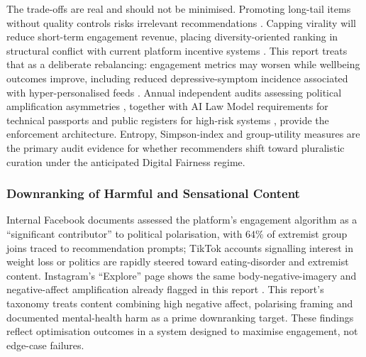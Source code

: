 \documentclass[11pt]{article}
\begin{document}
The trade-offs are real and should not be minimised. Promoting long-tail items without quality controls risks irrelevant recommendations \parencites[28]{6577872}. Capping virality will reduce short-term engagement revenue, placing diversity-oriented ranking in structural conflict with current platform incentive systems \parencites[14]{6502223}. This report treats that as a deliberate rebalancing: engagement metrics may worsen while wellbeing outcomes improve, including reduced depressive-symptom incidence associated with hyper-personalised feeds \parencites[20]{3303310}. Annual independent audits assessing political amplification asymmetries \parencites[16]{6502223}, together with AI Law Model requirements for technical passports and public registers for high-risk systems \parencites[19.5]{2977039}, provide the enforcement architecture. Entropy, Simpson-index and group-utility measures are the primary audit evidence for whether recommenders shift toward pluralistic curation under the anticipated Digital Fairness regime.

\subsubsection{Downranking of Harmful and Sensational Content}
\label{sec:downranking_harmful_sensational} Internal Facebook documents assessed \parencites[2244]{6502223} the platform's engagement algorithm as a ``significant contributor'' to political polarisation, with $64\%$ of extremist group joins traced to recommendation prompts; TikTok accounts signalling interest in weight loss or politics are rapidly steered toward eating-disorder and extremist content. Instagram's ``Explore'' page shows the same body-negative-imagery and negative-affect amplification already flagged in this report \parencites[3]{3303310}[20]{3303310}. This report's taxonomy treats content combining high negative affect, polarising framing and documented mental-health harm as a prime downranking target. These findings reflect optimisation outcomes in a system designed to maximise engagement, not edge-case failures.
\end{document}
